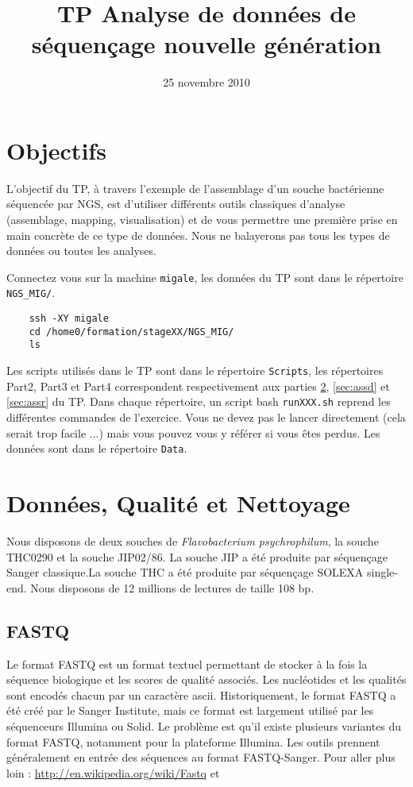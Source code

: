 \documentclass[a4paper,12pt]{article}
\title{TP Analyse de données de séquençage nouvelle génération}
\date{25 novembre 2010}
\begin{document}
 

\maketitle 
\section{Objectifs} 
L'objectif du TP, à travers l'exemple de l'assemblage d'un souche bactérienne séquencée par NGS, est d'utiliser différents outils classiques d'analyse (assemblage, mapping, visualisation) et de vous permettre une première prise en main concrète de ce type de données. Nous ne balayerons pas tous les types de données ou toutes les analyses.

Connectez vous sur la machine \verb=migale=, les données du TP sont dans le répertoire \verb=NGS_MIG/=.
\begin{lstlisting}
	ssh -XY migale
	cd /home0/formation/stageXX/NGS_MIG/
	ls
\end{lstlisting}



Les scripts utilisés dans le TP sont dans le répertoire \verb=Scripts=, les répertoires Part2, Part3 et Part4 correspondent respectivement aux parties \ref{sec:qual}, \ref{sec:assd} et \ref{sec:assr} du TP. Dans chaque répertoire, un script bash \verb=runXXX.sh= reprend les différentes commandes de l'exercice. Vous ne devez pas le lancer directement (cela serait trop facile ...) mais vous pouvez vous y référer si vous êtes perdus. Les données sont dans le répertoire \verb=Data=.


\section{Données, Qualité et Nettoyage}
\label{sec:qual}
Nous disposons de deux souches de \textit{Flavobacterium psychrophilum}, la souche THC0290 et la souche JIP02/86. La souche JIP a été produite par séquençage Sanger classique.La souche THC a été produite par séquençage SOLEXA single-end. Nous disposons de 12 millions de lectures de taille 108 bp. 

\subsection{FASTQ}
\label{sec:fastq}
Le format FASTQ est un format textuel permettant de stocker à la fois la séquence biologique et les scores de qualité associés. Les nucléotides et les qualités sont encodés chacun par un caractère ascii. Historiquement, le format FASTQ a été créé par le Sanger Institute, mais ce format est largement utilisé par les séquenceurs Illumina ou Solid. Le problème est qu'il existe plusieurs variantes du format FASTQ, notamment pour la plateforme Illumina. Les outils prennent généralement en entrée des séquences au format FASTQ-Sanger.
Pour aller plus loin : \url{http://en.wikipedia.org/wiki/Fastq} et \cite{Cock:2009p1945} 
\end{document}
